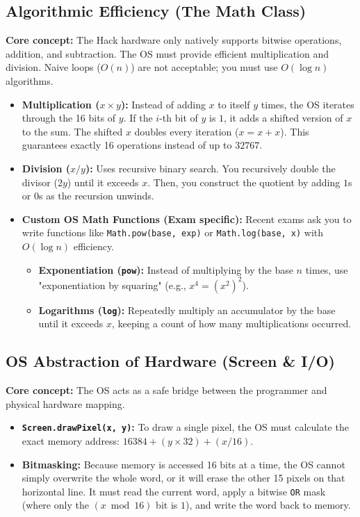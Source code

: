 \documentclass[12pt,a4paper]{article}
\begin{document}
\subsection{Algorithmic Efficiency (The Math Class)}
\textbf{Core concept:} The Hack hardware only natively supports bitwise operations, addition, and subtraction. The OS must provide efficient multiplication and division. Naive loops ($O(n)$) are not acceptable; you must use $O(\log n)$ algorithms.
\begin{itemize}
    \item \textbf{Multiplication ($x \times y$):} Instead of adding $x$ to itself $y$ times, the OS iterates through the 16 bits of $y$. If the $i$-th bit of $y$ is $1$, it adds a shifted version of $x$ to the sum. The shifted $x$ doubles every iteration ($x = x + x$). This guarantees exactly 16 operations instead of up to $32767$.
    \item \textbf{Division ($x / y$):} Uses recursive binary search. You recursively double the divisor ($2y$) until it exceeds $x$. Then, you construct the quotient by adding $1$s or $0$s as the recursion unwinds.
    \item \textbf{Custom OS Math Functions (Exam specific):} Recent exams ask you to write functions like \texttt{Math.pow(base, exp)} or \texttt{Math.log(base, x)} with $O(\log n)$ efficiency.
    \begin{itemize}
        \item \textbf{Exponentiation (\texttt{pow}):} Instead of multiplying by the base $n$ times, use "exponentiation by squaring" (e.g., $x^4 = (x^2)^2$). 
        \item \textbf{Logarithms (\texttt{log}):} Repeatedly multiply an accumulator by the base until it exceeds $x$, keeping a count of how many multiplications occurred.
    \end{itemize}
\end{itemize}

\subsection{OS Abstraction of Hardware (Screen \& I/O)}
\textbf{Core concept:} The OS acts as a safe bridge between the programmer and physical hardware mapping.
\begin{itemize}
    \item \textbf{\texttt{Screen.drawPixel(x, y)}:} To draw a single pixel, the OS must calculate the exact memory address: $16384 + (y \times 32) + (x / 16)$. 
    \item \textbf{Bitmasking:} Because memory is accessed 16 bits at a time, the OS cannot simply overwrite the whole word, or it will erase the other 15 pixels on that horizontal line. It must read the current word, apply a bitwise \texttt{OR} mask (where only the $(x \bmod 16)$ bit is $1$), and write the word back to memory.
\end{itemize}
\end{document}

